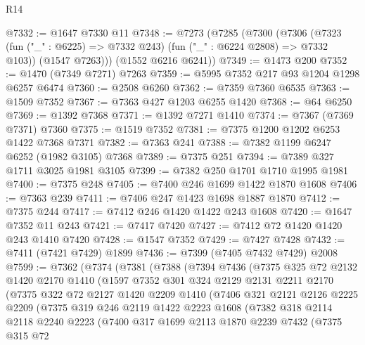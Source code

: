 \begin{lexlean}{R14}
\begin{coremodule}
@7332 := @1647 @7330 @11
@7348 := @7273
    (@7285
      (@7300
        (@7306
          (@7323 (fun ("_" : @6225) => @7332 @243) (fun ("_" : @6224 @2808) => @7332 @103))
          (@1547 @7263)))
      (@1552 @6216 @6241))
@7349 := @1473 @200
@7352 := @1470 (@7349 @7271) @7263
@7359 := @5995 @7352 @217 @93 @1204 @1298 @6257 @6474
@7360 := @2508 @6260
@7362 := @7359 @7360 @6535
@7363 := @1509 @7352
@7367 := @7363 @427 @1203 @6255 @1420
@7368 := @64 @6250
@7369 := @1392 @7368
@7371 := @1392 @7271 @1410
@7374 := @7367 (@7369 @7371) @7360
@7375 := @1519 @7352
@7381 := @7375 @1200 @1202 @6253 @1422 @7368 @7371
@7382 := @7363 @241
@7388 := @7382 @1199 @6247 @6252 (@1982 @3105) @7368
@7389 := @7375 @251
@7394 := @7389 @327 @1711 @3025 @1981 @3105
@7399 := @7382 @250 @1701 @1710 @1995 @1981
@7400 := @7375 @248
@7405 := @7400 @246 @1699 @1422 @1870 @1608
@7406 := @7363 @239
@7411 := @7406 @247 @1423 @1698 @1887 @1870
@7412 := @7375 @244
@7417 := @7412 @246 @1420 @1422 @243 @1608
@7420 := @1647 @7352 @11 @243
@7421 := @7417 @7420
@7427 := @7412 @72 @1420 @1420 @243 @1410 @7420
@7428 := @1547 @7352
@7429 := @7427 @7428
@7432 := @7411 (@7421 @7429) @1899
@7436 := @7399 (@7405 @7432 @7429) @2008
@7599 := @7362
    (@7374
      (@7381
        (@7388
          (@7394
            @7436
            (@7375
              @325
              @72
              @2132
              @1420
              @2170
              @1410
              (@1597
                @7352
                @301
                @324
                @2129
                @2131
                @2211
                @2170
                (@7375
                  @322
                  @72
                  @2127
                  @1420
                  @2209
                  @1410
                  (@7406
                    @321
                    @2121
                    @2126
                    @2225
                    @2209
                    (@7375
                      @319
                      @246
                      @2119
                      @1422
                      @2223
                      @1608
                      (@7382
                        @318
                        @2114
                        @2118
                        @2240
                        @2223
                        (@7400
                          @317
                          @1699
                          @2113
                          @1870
                          @2239
                          @7432
                          (@7375
                            @315
                            @72

\end{coremodule}
\end{lexlean}
